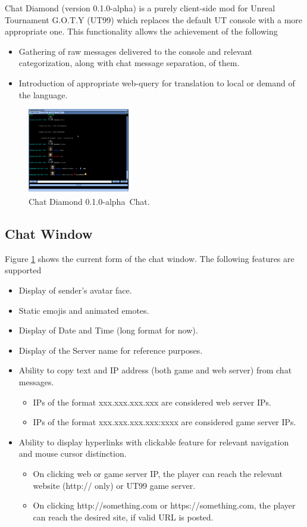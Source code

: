 \documentclass{article}
\theoremstyle{definition}
\newcommand{\ChatDiamondVersion}{0.1.0-alpha}
\begin{document}
Chat Diamond (version \ChatDiamondVersion) is a purely client-side mod for Unreal Tournament G.O.T.Y (UT99) which replaces the default UT console with a more appropriate one.  This functionality allows the achievement of the following
\begin{itemize}
\item Gathering of raw messages delivered to the console and relevant categorization, along with chat message separation, of them.
\item Introduction of appropriate web-query for translation to local or demand of the language.
\end{itemize}

\begin{figure}
\centering
\includegraphics[width=0.4\textwidth]{img}
\caption{Chat Diamond \ChatDiamondVersion~Chat.}
\label{fig:chatdiamond}
\end{figure}

\subsection{Chat Window}
Figure \ref{fig:chatdiamond} shows the current form of the chat window. The following features are supported
\begin{itemize}
\item Display of sender's avatar face.
\item Static emojis and animated emotes.
\item Display of Date and Time (long format for now).
\item Display of the Server name for reference purposes.
\item Ability to copy text and IP address (both game and web server) from chat messages.
\begin{itemize}
\item IPs of the format xxx.xxx.xxx.xxx are considered web server IPs.
\item IPs of the format xxx.xxx.xxx.xxx:xxxx are considered game server IPs.
\end{itemize}
\item Ability to display hyperlinks with clickable feature for relevant navigation and mouse cursor distinction.
\begin{itemize}
\item On clicking web or game server IP, the player can reach the relevant website (http:// only) or UT99 game server.
\item On clicking http://something.com or https://something.com, the player can reach the desired site, if valid URL is posted.
\end{itemize}
\end{itemize}
\end{document}
